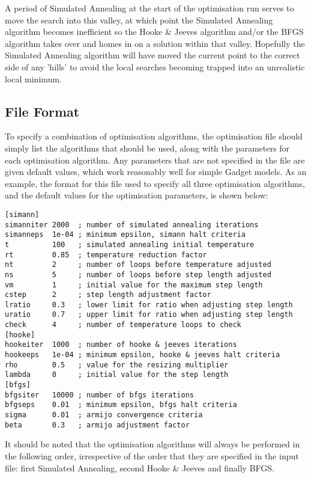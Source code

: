 \documentclass [a4paper, 10pt]{book}
\begin{document}
\bigskip
A period of Simulated Annealing at the start of the optimisation run serves to move the search into this valley, at which point the Simulated Annealing algorithm becomes inefficient so the Hooke \& Jeeves algorithm and/or the BFGS algorithm takes over and homes in on a solution within that valley.  Hopefully the Simulated Annealing algorithm will have moved the current point to the correct side of any 'hills' to avoid the local searches becoming trapped into an unrealistic local minimum.

\subsection{File Format}\label{subsec:combinefile}
To specify a combination of optimisation algorithms, the optimisation file should simply list the algorithms that should be used, along with the parameters for each optimisation algorithm.  Any parameters that are not specified in the file are given default values, which work reasonably well for simple Gadget models.  As an example, the format for this file used to specify all three optimisation algorithms, and the default values for the optimisation parameters, is shown below:

{\small\begin{verbatim}
[simann]
simanniter 2000  ; number of simulated annealing iterations
simanneps  1e-04 ; minimum epsilon, simann halt criteria
t          100   ; simulated annealing initial temperature
rt         0.85  ; temperature reduction factor
nt         2     ; number of loops before temperature adjusted
ns         5     ; number of loops before step length adjusted
vm         1     ; initial value for the maximum step length
cstep      2     ; step length adjustment factor
lratio     0.3   ; lower limit for ratio when adjusting step length
uratio     0.7   ; upper limit for ratio when adjusting step length
check      4     ; number of temperature loops to check
[hooke]
hookeiter  1000  ; number of hooke & jeeves iterations
hookeeps   1e-04 ; minimum epsilon, hooke & jeeves halt criteria
rho        0.5   ; value for the resizing multiplier
lambda     0     ; initial value for the step length
[bfgs]
bfgsiter   10000 ; number of bfgs iterations
bfgseps    0.01  ; minimum epsilon, bfgs halt criteria
sigma      0.01  ; armijo convergence criteria
beta       0.3   ; armijo adjustment factor
\end{verbatim}}

\newpage %
It should be noted that the optimisation algorithms will always be performed in the following order, irrespective of the order that they are specified in the input file: first Simulated Annealing, second Hooke \& Jeeves and finally BFGS.
\end{document}
